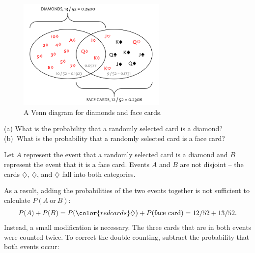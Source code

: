 \begin{figure}[h]
	\centering
	\includegraphics[width=0.65\textwidth]{ch_probability_oi_biostat/figures/cardsDiamondFaceVenn/cardsDiamondFaceVenn.png}
	\caption{A Venn diagram for diamonds and face cards.}
	\label{fig:cardsDiamondFaceVenn}
\end{figure}

\begin{exercisewrap}
\begin{nexercise}
(a) What is the probability that a randomly selected card is a diamond? (b)~What is the probability that a randomly selected card is a face card?\footnotemark{}
\end{nexercise}
\end{exercisewrap}

\textD{\newpage}

Let $A$ represent the event that a randomly selected card is a diamond and $B$ represent the event that it is a face card. Events $A$ and $B$ are not disjoint -- the cards {\color{redcards}$\diamondsuit$}, {\color{redcards}$\diamondsuit$}, and {\color{redcards}$\diamondsuit$} fall into both categories. 

As a result, adding the probabilities of the two events together is not sufficient to calculate $P(A \ \text{or} \ B)$:
\begin{eqnarray*}
	P(A) + P(B) = P({\color{redcards}\diamondsuit}) + P(\text{face card}) = 12/52 + 13/52.
	\label{overCountFaceDiamond}
\end{eqnarray*}
Instead, a small modification is necessary. The three cards that are in both events were counted twice. To correct the double counting, subtract the probability that both events occur:

